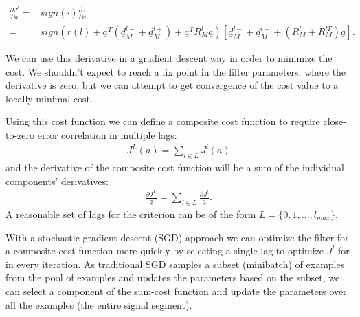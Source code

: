 \documentclass[journal,onecolumn]{IEEEtran}
\begin{document}
\begin{align*}
\frac{\partial J^l}{\partial \underline{a}} = & sign(\cdot)\frac{\partial \cdot}{\partial \underline{a}} \\
 = & sign\left( r(l) + \underline{a}^T\left( \underline{d}_M^{l-} + \underline{d}_M^{l+} \right) + \underline{a}^T R_M^l\underline{a} \right) \left[ \underline{d}_M^{l-} + \underline{d}_M^{l+} + \left( R_M^l + R_M^{lT} \right)\underline{a} \right].
\end{align*}

We can use this derivative in a gradient descent way in order to minimize the cost. We shouldn't expect to reach a fix point in the filter parameters, where the derivative is zero, but we can attempt to get convergence of the cost value to a locally minimal cost.

Using this cost function we can define a composite cost function to require close-to-zero error correlation in multiple lags:
\begin{align*}
J^{L}(\underline{a}) = \sum\limits_{l\in L}{J^l(\underline{a})}
\end{align*}
and the derivative of the composite cost function will be a sum of the individual components' derivatives:
\begin{align*}
\frac{\partial J^L}{\underline{a}} = \sum\limits_{l\in L}{\frac{\partial J^l}{\underline{a}}}.
\end{align*}
A reasonable set of lags for the criterion can be of the form $L = \{ 0,1,\ldots, l_{max} \}$.

With a stochastic gradient descent (SGD) approach we can optimize the filter for a composite cost function more quickly by selecting a single lag to optimize $J^l$ for in every iteration. As traditional SGD samples a subset (minibatch) of examples from the pool of examples and updates the parameters based on the subset, we can select a component of the sum-cost function and update the parameters over all the examples (the entire signal segment).

\end{document}
